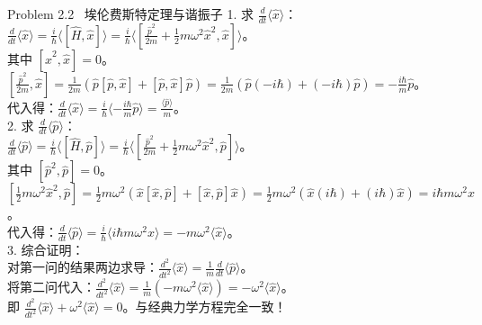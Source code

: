 \documentclass[a4paper,11pt]{article}
\begin{document}
\begin{solution}{Problem 2.2 \textbar\ 埃伦费斯特定理与谐振子}
1. 求 $\frac{d}{dt}\langle \hat{x} \rangle$：\\
$\frac{d}{dt}\langle \hat{x} \rangle = \frac{i}{\hbar} \langle [\hat{H}, \hat{x}] \rangle = \frac{i}{\hbar} \langle [\frac{\hat{p}^2}{2m} + \frac{1}{2}m\omega^2 \hat{x}^2, \hat{x}] \rangle$。\\
其中 $[\hat{x}^2, \hat{x}] = 0$。\\
$[\frac{\hat{p}^2}{2m}, \hat{x}] = \frac{1}{2m} (\hat{p}[\hat{p}, \hat{x}] + [\hat{p}, \hat{x}]\hat{p}) = \frac{1}{2m} (\hat{p}(-i\hbar) + (-i\hbar)\hat{p}) = -\frac{i\hbar}{m} \hat{p}$。\\
代入得：$\frac{d}{dt}\langle \hat{x} \rangle = \frac{i}{\hbar} \langle -\frac{i\hbar}{m} \hat{p} \rangle = \frac{\langle \hat{p} \rangle}{m}$。\\

2. 求 $\frac{d}{dt}\langle \hat{p} \rangle$：\\
$\frac{d}{dt}\langle \hat{p} \rangle = \frac{i}{\hbar} \langle [\hat{H}, \hat{p}] \rangle = \frac{i}{\hbar} \langle [\frac{\hat{p}^2}{2m} + \frac{1}{2}m\omega^2 \hat{x}^2, \hat{p}] \rangle$。\\
其中 $[\hat{p}^2, \hat{p}] = 0$。\\
$[\frac{1}{2}m\omega^2 \hat{x}^2, \hat{p}] = \frac{1}{2}m\omega^2 (\hat{x}[\hat{x}, \hat{p}] + [\hat{x}, \hat{p}]\hat{x}) = \frac{1}{2}m\omega^2 (\hat{x}(i\hbar) + (i\hbar)\hat{x}) = i\hbar m\omega^2 \hat{x}$。\\
代入得：$\frac{d}{dt}\langle \hat{p} \rangle = \frac{i}{\hbar} \langle i\hbar m\omega^2 \hat{x} \rangle = -m\omega^2 \langle \hat{x} \rangle$。\\

3. 综合证明：\\
对第一问的结果两边求导：$\frac{d^2}{dt^2}\langle \hat{x} \rangle = \frac{1}{m} \frac{d}{dt}\langle \hat{p} \rangle$。\\
将第二问代入：$\frac{d^2}{dt^2}\langle \hat{x} \rangle = \frac{1}{m} (-m\omega^2 \langle \hat{x} \rangle) = -\omega^2 \langle \hat{x} \rangle$。\\
即 $\frac{d^2}{dt^2}\langle \hat{x} \rangle + \omega^2 \langle \hat{x} \rangle = 0$。与经典力学方程完全一致！
\end{solution}
\end{document}
